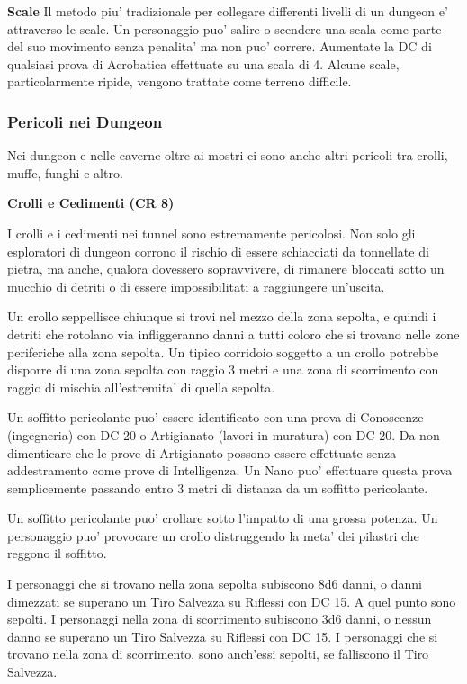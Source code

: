 \documentclass[a4paper,11pt,twoside,openany]{dndbook}
\begin{document}
\textbf{Scale} Il metodo piu' tradizionale per collegare differenti livelli di un dungeon e' attraverso le scale. Un personaggio puo' salire o scendere una scala come parte del suo movimento senza penalita' ma non puo' correre. Aumentate la DC di qualsiasi prova di Acrobatica effettuate su una scala di 4. Alcune scale, particolarmente ripide, vengono trattate come terreno difficile.

\subsubsection{Pericoli nei Dungeon}

Nei dungeon e nelle caverne oltre ai mostri ci sono anche altri pericoli tra crolli, muffe, funghi e altro.

\textbf{Crolli e Cedimenti (CR 8)}

I crolli e i cedimenti nei tunnel sono estremamente pericolosi. Non solo gli esploratori di dungeon corrono il rischio di essere schiacciati da tonnellate di pietra, ma anche, qualora dovessero sopravvivere, di rimanere bloccati sotto un mucchio di detriti o di essere impossibilitati a raggiungere un'uscita.

Un crollo seppellisce chiunque si trovi nel mezzo della zona sepolta, e quindi i detriti che rotolano via infliggeranno danni a tutti coloro che si trovano nelle zone periferiche alla zona sepolta. Un tipico corridoio soggetto a un crollo potrebbe disporre di una zona sepolta con raggio 3 metri e una zona di scorrimento con raggio di mischia all'estremita' di quella sepolta.

Un soffitto pericolante puo' essere identificato con una prova di Conoscenze (ingegneria) con DC 20 o Artigianato (lavori in muratura) con DC 20. Da non dimenticare che le prove di Artigianato possono essere effettuate senza addestramento come prove di Intelligenza. Un Nano puo' effettuare questa prova semplicemente passando entro 3 metri di distanza da un soffitto pericolante. 

Un soffitto pericolante puo' crollare sotto l'impatto di una grossa potenza. Un personaggio puo' provocare un crollo distruggendo la meta' dei pilastri che reggono il soffitto.

I personaggi che si trovano nella zona sepolta subiscono 8d6 danni, o danni dimezzati se superano un Tiro Salvezza su Riflessi con DC 15. A quel punto sono sepolti. I personaggi nella zona di scorrimento subiscono 3d6 danni, o nessun danno se superano un Tiro Salvezza su Riflessi con DC 15. I personaggi che si trovano nella zona di scorrimento, sono anch'essi sepolti, se falliscono il Tiro Salvezza.
\end{document}
